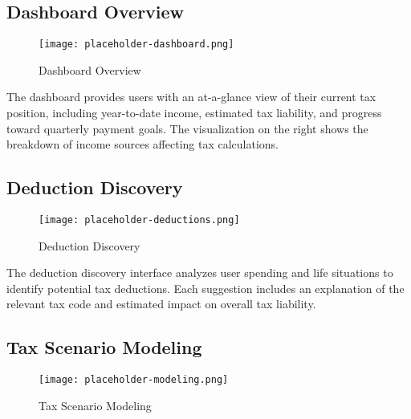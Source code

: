 \documentclass[
  11pt,
  letterpaper,
]{article}
\begin{document}
\hypertarget{dashboard-overview}{%
\subsection{Dashboard Overview}\label{dashboard-overview}}

\begin{figure}

{\centering \texttt{[image: placeholder-dashboard.png]}

}

\caption{Dashboard Overview}

\end{figure}

The dashboard provides users with an at-a-glance view of their current
tax position, including year-to-date income, estimated tax liability,
and progress toward quarterly payment goals. The visualization on the
right shows the breakdown of income sources affecting tax calculations.

\hypertarget{deduction-discovery}{%
\subsection{Deduction Discovery}\label{deduction-discovery}}

\begin{figure}

{\centering \texttt{[image: placeholder-deductions.png]}

}

\caption{Deduction Discovery}

\end{figure}

The deduction discovery interface analyzes user spending and life
situations to identify potential tax deductions. Each suggestion
includes an explanation of the relevant tax code and estimated impact on
overall tax liability.

\hypertarget{tax-scenario-modeling}{%
\subsection{Tax Scenario Modeling}\label{tax-scenario-modeling}}

\begin{figure}

{\centering \texttt{[image: placeholder-modeling.png]}

}

\caption{Tax Scenario Modeling}

\end{figure}
\end{document}
